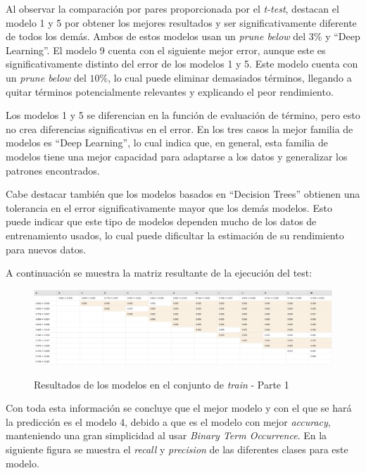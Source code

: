 \documentclass[es]{uc3mreport}
\begin{document}
\begin{report}
    Al observar la comparación por pares proporcionada por el \textit{t-test},
    destacan el modelo 1 y 5 por obtener los mejores resultados y ser significativamente
    diferente de todos los demás. Ambos de estos modelos usan un \textit{prune below}
    del $3\%$ y ``Deep Learning''. El modelo 9 cuenta con el siguiente mejor error,
    aunque este es significativamente distinto del error de los modelos 1 y 5. Este
    modelo cuenta con un \textit{prune below} del $10\%$, lo cual puede eliminar
    demasiados términos, llegando a quitar términos potencialmente relevantes y
    explicando el peor rendimiento.

    Los modelos 1 y 5 se diferencian en la función de evaluación de término, pero
    esto no crea diferencias significativas en el error. En los tres casos la mejor
    familia de modelos es ``Deep Learning'', lo cual indica que, en general, esta
    familia de modelos tiene una mejor capacidad para adaptarse a los datos y
    generalizar los patrones encontrados.

    Cabe destacar también que los modelos basados en ``Decision Trees'' obtienen
    una tolerancia en el error significativamente mayor que los demás modelos.
    Esto puede indicar que este tipo de modelos dependen mucho de los datos de
    entrenamiento usados, lo cual puede dificultar la estimación de su rendimiento
    para nuevos datos.

    A continuación se muestra la matriz resultante de la ejecución del test:

    \begin{figure}[H]
        \center
        \includegraphics[width=\linewidth]{t_test1.jpeg}\\ 
        \caption{Resultados de los modelos en el conjunto de \textit{train} - Parte 1}
    \end{figure}

    Con toda esta información se concluye que el mejor modelo y con el que se hará
    la predicción es el modelo 4, debido a que es el modelo con mejor
    \textit{accuracy}, manteniendo una gran simplicidad al usar \textit{Binary Term
    Occurrence}. En la siguiente figura se muestra el \textit{recall} y
    \textit{precision} de las diferentes clases para este modelo.


\end{report}
\end{document}
